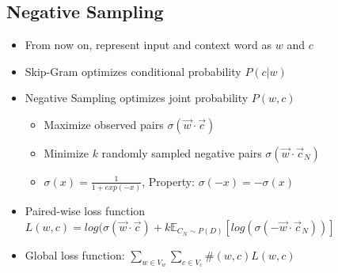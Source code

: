 \documentclass[compress]{beamer}
\begin{document}
\subsection{Negative Sampling}
\begin{frame}{\subsecname} 
  \begin{itemize}
    \item From now on, represent input and context word as $w$ and $c$
    \item Skip-Gram optimizes conditional probability $P(c|w)$
    \item Negative Sampling optimizes joint probability $P(w,c)$
    \begin{itemize}
      \item Maximize observed pairs $\sigma(\vec{w} \cdot \vec{c}) $
      \item Minimize $k$ randomly sampled negative pairs $\sigma(\vec{w} \cdot \vec{c}_N)$
      \item $\sigma(x) = \frac{1}{1+exp(-x)}$, Property: $\sigma(-x)=-\sigma(x)$
    \end{itemize}
	\item Paired-wise loss function $L(w,c)=log(\sigma(\vec{w}\cdot \vec{c})+k\mathbb{E}_{{C_N}\sim P(D)}\left [ log(\sigma(-\vec{w}\cdot \vec{c}_N)) \right ]$
    \item Global loss function: $\sum\limits_{w\in V_w}\sum\limits_{c \in V_c}\#(w,c)L(w,c)$
  \end{itemize}
\end{frame}
\end{document}
